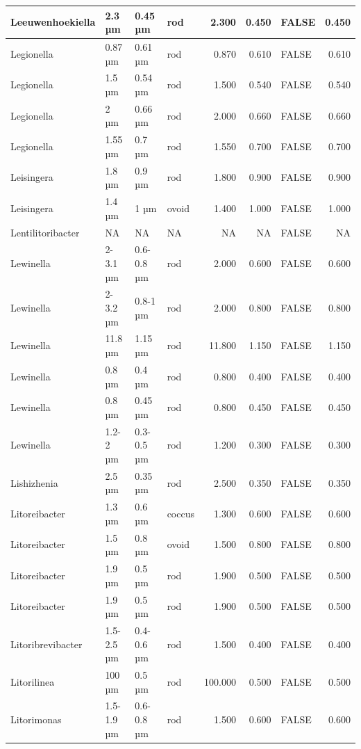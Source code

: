 \documentclass[
]{article}
\begin{document}
\begin{table}
\begin{tabular}{l|l|l|l|r|r|l|r}
\hline
Leeuwenhoekiella & 2.3 µm & 0.45 µm & rod & 2.300 & 0.450 & FALSE & 0.450\\
\hline
Legionella & 0.87 µm & 0.61 µm & rod & 0.870 & 0.610 & FALSE & 0.610\\
\hline
Legionella & 1.5 µm & 0.54 µm & rod & 1.500 & 0.540 & FALSE & 0.540\\
\hline
Legionella & 2 µm & 0.66 µm & rod & 2.000 & 0.660 & FALSE & 0.660\\
\hline
Legionella & 1.55 µm & 0.7 µm & rod & 1.550 & 0.700 & FALSE & 0.700\\
\hline
Leisingera & 1.8 µm & 0.9 µm & rod & 1.800 & 0.900 & FALSE & 0.900\\
\hline
Leisingera & 1.4 µm & 1 µm & ovoid & 1.400 & 1.000 & FALSE & 1.000\\
\hline
Lentilitoribacter & NA & NA & NA & NA & NA & FALSE & NA\\
\hline
Lewinella & 2-3.1 µm & 0.6-0.8 µm & rod & 2.000 & 0.600 & FALSE & 0.600\\
\hline
Lewinella & 2-3.2 µm & 0.8-1 µm & rod & 2.000 & 0.800 & FALSE & 0.800\\
\hline
Lewinella & 11.8 µm & 1.15 µm & rod & 11.800 & 1.150 & FALSE & 1.150\\
\hline
Lewinella & 0.8 µm & 0.4 µm & rod & 0.800 & 0.400 & FALSE & 0.400\\
\hline
Lewinella & 0.8 µm & 0.45 µm & rod & 0.800 & 0.450 & FALSE & 0.450\\
\hline
Lewinella & 1.2-2 µm & 0.3-0.5 µm & rod & 1.200 & 0.300 & FALSE & 0.300\\
\hline
Lishizhenia & 2.5 µm & 0.35 µm & rod & 2.500 & 0.350 & FALSE & 0.350\\
\hline
Litoreibacter & 1.3 µm & 0.6 µm & coccus & 1.300 & 0.600 & FALSE & 0.600\\
\hline
Litoreibacter & 1.5 µm & 0.8 µm & ovoid & 1.500 & 0.800 & FALSE & 0.800\\
\hline
Litoreibacter & 1.9 µm & 0.5 µm & rod & 1.900 & 0.500 & FALSE & 0.500\\
\hline
Litoreibacter & 1.9 µm & 0.5 µm & rod & 1.900 & 0.500 & FALSE & 0.500\\
\hline
Litoribrevibacter & 1.5-2.5 µm & 0.4-0.6 µm & rod & 1.500 & 0.400 & FALSE & 0.400\\
\hline
Litorilinea & 100 µm & 0.5 µm & rod & 100.000 & 0.500 & FALSE & 0.500\\
\hline
Litorimonas & 1.5-1.9 µm & 0.6-0.8 µm & rod & 1.500 & 0.600 & FALSE & 0.600\\

\end{tabular}
\end{table}
\end{document}
